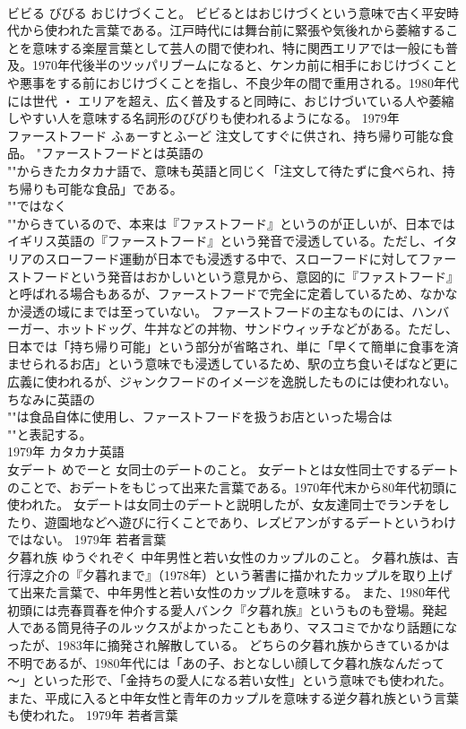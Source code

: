 \documentclass[8pt]{extreport}
\begin{document}
\begin{CJK}{UTF8}{min}
\\	ビビる	びびる	おじけづくこと。	ビビるとはおじけづくという意味で古く平安時代から使われた言葉である。江戸時代には舞台前に緊張や気後れから萎縮することを意味する楽屋言葉として芸人の間で使われ、特に関西エリアでは一般にも普及。1970年代後半のツッパリブームになると、ケンカ前に相手におじけづくことや悪事をする前におじけづくことを指し、不良少年の間で重用される。1980年代には世代 ・ エリアを超え、広く普及すると同時に、おじけづいている人や萎縮しやすい人を意味する名詞形のびびりも使われるようになる。	1979年	
\\	ファーストフード	ふぁーすとふーど	注文してすぐに供され、持ち帰り可能な食品。	"ファーストフードとは英語の
\\	""からきたカタカナ語で、意味も英語と同じく「注文して待たずに食べられ、持ち帰りも可能な食品」である。
\\	""ではなく
\\	""からきているので、本来は『ファストフード』というのが正しいが、日本ではイギリス英語の『ファーストフード』という発音で浸透している。ただし、イタリアのスローフード運動が日本でも浸透する中で、スローフードに対してファーストフードという発音はおかしいという意見から、意図的に『ファストフード』と呼ばれる場合もあるが、ファーストフードで完全に定着しているため、なかなか浸透の域にまでは至っていない。 ファーストフードの主なものには、ハンバーガー、ホットドッグ、牛丼などの丼物、サンドウィッチなどがある。ただし、日本では「持ち帰り可能」という部分が省略され、単に「早くて簡単に食事を済ませられるお店」という意味でも浸透しているため、駅の立ち食いそばなど更に広義に使われるが、ジャンクフードのイメージを逸脱したものには使われない。 ちなみに英語の
\\	""は食品自体に使用し、ファーストフードを扱うお店といった場合は
\\	""と表記する。
\\	1979年	カタカナ英語	
\\	女デート	めでーと	女同士のデートのこと。	女デートとは女性同士でするデートのことで、おデートをもじって出来た言葉である。1970年代末から80年代初頭に使われた。 女デートは女同士のデートと説明したが、女友達同士でランチをしたり、遊園地などへ遊びに行くことであり、レズビアンがするデートというわけではない。	1979年	若者言葉	
\\	夕暮れ族	ゆうぐれぞく	中年男性と若い女性のカップルのこと。	夕暮れ族は、吉行淳之介の『夕暮れまで』（1978年）という著書に描かれたカップルを取り上げて出来た言葉で、中年男性と若い女性のカップルを意味する。 また、1980年代初頭には売春買春を仲介する愛人バンク『夕暮れ族』というものも登場。発起人である筒見待子のルックスがよかったこともあり、マスコミでかなり話題になったが、1983年に摘発され解散している。 どちらの夕暮れ族からきているかは不明であるが、1980年代には「あの子、おとなしい顔して夕暮れ族なんだって～」といった形で、「金持ちの愛人になる若い女性」という意味でも使われた。また、平成に入ると中年女性と青年のカップルを意味する逆夕暮れ族という言葉も使われた。	1979年	若者言葉	

\end{CJK}
\end{document}
